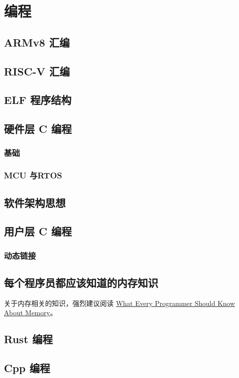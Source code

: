 \chapter{编程}

\section{ARMv8 汇编}

\section{RISC-V 汇编}

\section{ELF 程序结构}

\section{硬件层 C 编程}
\subsection{基础}
\subsection{MCU 与RTOS}

\section{软件架构思想}

\section{用户层 C 编程}
\subsection{动态链接}

\section{每个程序员都应该知道的内存知识}

关于内存相关的知识，强烈建议阅读
\href{https://people.freebsd.org/~lstewart/articles/cpumemory.pdf}{What Every Programmer Should Know About Memory}。

\section{Rust 编程}

\section{Cpp 编程}

